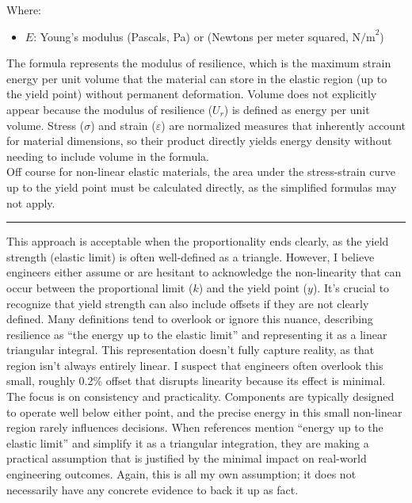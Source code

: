 \documentclass{article}
\begin{document}
Where:
\begin{itemize}[itemsep=-1mm]
    \item \( E \): {Young's modulus} (Pascals, Pa) or (Newtons per meter squared, \( \text{N/m}^2 \))
\end{itemize}
The formula represents the modulus of resilience, which is the maximum strain energy per unit volume that the material can store in the elastic region (up to the yield point) without permanent deformation. Volume does not explicitly appear because the modulus of resilience (\(U_r\)) is defined as energy per unit volume. Stress (\(\sigma\)) and strain (\(\varepsilon\)) are normalized measures that inherently account for material dimensions, so their product directly yields energy density without needing to include volume in the formula.\\[8pt]
Off course for non-linear elastic materials, the area under the stress-strain curve up to the yield point must be calculated directly, as the simplified formulas may not apply.\\[1em]
\hrule\vspace{1em}
This approach is acceptable when the proportionality ends clearly, as the yield strength (elastic limit) is often well-defined as a triangle. However, I believe engineers either assume or are hesitant to acknowledge the non-linearity that can occur between the proportional limit (\(k\)) and the yield point (\(y\)). It’s crucial to recognize that yield strength can also include offsets if they are not clearly defined. Many definitions tend to overlook or ignore this nuance, describing resilience as “the energy up to the elastic limit” and representing it as a linear triangular integral. This representation doesn’t fully capture reality, as that region isn’t always entirely linear. I suspect that engineers often overlook this small, roughly 0.2\% offset that disrupts linearity because its effect is minimal. The focus is on consistency and practicality. Components are typically designed to operate well below either point, and the precise energy in this small non-linear region rarely influences decisions. When references mention “energy up to the elastic limit” and simplify it as a triangular integration, they are making a practical assumption that is justified by the minimal impact on real-world engineering outcomes. Again, this is all my own assumption; it does not necessarily have any concrete evidence to back it up as fact.
\newpage    
\end{document}
